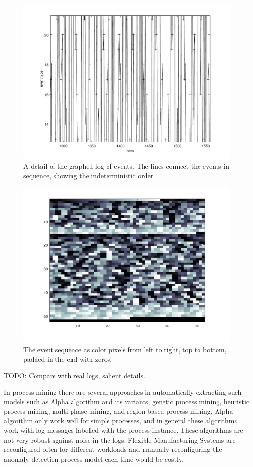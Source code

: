 \documentclass[journal]{IEEEtran}
\begin{document}
\begin{figure}[tb]
 \centering
 \includegraphics[width=8 cm,keepaspectratio=true]{./zoomed_events.png}
 \caption{A detail of the graphed log of events. The lines connect the events in sequence, showing the indeterministic order}
 \label{figure:zoomed_events}
\end{figure}

\begin{figure}[tb]
 \centering
 \includegraphics[width=8 cm,keepaspectratio=true]{./color_vis2.png}
 \caption{The event sequence as color pixels from left to right, top to bottom, padded in the end with zeros.}
 \label{figure:color_vis2}
\end{figure}

TODO: Compare with real logs, salient details.

In process mining there are several approaches in automatically extracting such models such as Alpha algorithm and its 
variants, genetic process mining, heuristic process mining, multi phase mining, and region-based process mining. Alpha algorithm only work well for simple processes,
and in general these algorithms work with log messages labelled with the process instance. These algorithms are not very robust against noise in the logs.
Flexible Manufacturing Systems are reconfigured often for different workloads and manually reconfiguring the anomaly
detection process model each time would be costly.
\end{document}
